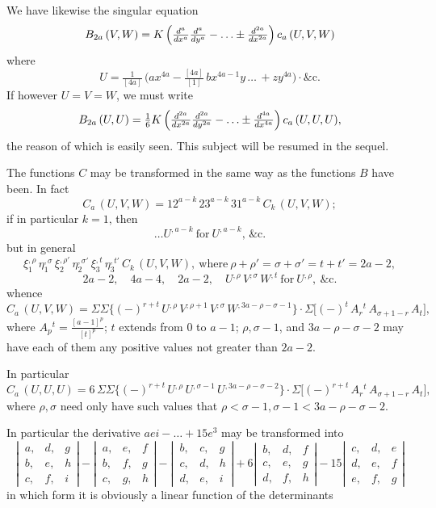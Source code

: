 \documentclass[11pt]{article}
\begin{document}
We have likewise the singular equation
\[
B_{2a}\,(V, W) = K\,\Bigl(\tfrac{d^a}{dx^a}\tfrac{d^a}{dy^a} - \ldots \pm \tfrac{d^{2a}}{dx^{2a}}\Bigr)\,c_a\,(U, V, W)
\]
where
\[
U = \tfrac{1}{[4a]}\,\bigl(a x^{4a} - \tfrac{[4a]}{[1]}\,b x^{4a-1} y \,\ldots\,+ z y^{4a}\bigr) \cdot \&\text{c.}
\]
If however $U = V = W$, we must write
\[
B_{2a}\,(U, U) = \tfrac{1}{6} K\,\Bigl(\tfrac{d^{2a}}{dx^{2a}}\tfrac{d^{2a}}{dy^{2a}} - \ldots \pm \tfrac{d^{4a}}{dx^{4a}}\Bigr)\,c_a\,(U, U, U),
\]
the reason of which is easily seen. This subject will be resumed in the sequel.

The functions $C$ may be transformed in the same way as the functions $B$ have been.
In fact
\[
C_a\,(U, V, W) = 12^{a-k}\,23^{a-k}\,31^{a-k}\,C_k\,(U, V, W);
\]
if in particular $k=1$, then
\[
\ldots U^{,a-k}\ \text{for}\ U^{,a-k},\,\&\text{c}.
\]
but in general
\[
\xi_1^{,\rho}\,\eta_1^{,\sigma}\,\xi_2^{,\rho'}\,\eta_2^{,\sigma'}\,\xi_3^{,t}\,\eta_3^{,t'}\,C_k\,(U, V, W),\ \text{where}\ \rho + \rho' = \sigma + \sigma' = t + t' = 2a - 2,
\]
\[
2a - 2,\quad 4a - 4,\quad 2a - 2,\quad U^{,\rho}\,V^{,\sigma}\,W^{,t}\ \text{for}\ U^{,\rho},\ \&\text{c.}
\]
whence
\[
C_a\,(U, V, W) = \Sigma\Sigma\bigl\{(-)^{r+t}\,U^{,\rho}\,V^{,\rho+1}\,V^{,\sigma}\,W^{,3a-\rho-\sigma-1}\bigr\}\cdot\Sigma\bigl[(-)^t\,A_r{}^t\,A_{\sigma+1-r}\,A_t\bigr],
\]
where $A_p{}^t = \tfrac{[a-1]^p}{[t]^p}$; $t$ extends from 0 to $a-1$; $\rho, \sigma - 1$, and $3a - \rho - \sigma - 2$ may have
each of them any positive values not greater than $2a - 2$.

In particular
\[
C_a\,(U, U, U) = 6\,\Sigma\Sigma\bigl\{(-)^{r+t}\,U^{,\rho}\,U^{,\sigma-1}\,U^{,3a-\rho-\sigma-2}\bigr\}\cdot\Sigma\bigl[(-)^{r+t}\,A_r{}^t\,A_{\sigma+1-r}\,A_t\bigr],
\]
where $\rho, \sigma$ need only have such values that $\rho < \sigma - 1, \sigma - 1 < 3a - \rho - \sigma - 2$.

In particular the derivative $aei - \ldots + 15 e^3$ may be transformed into
\[
\left|\,\begin{array}{ccc} a, & d, & g \\ b, & e, & h \\ c, & f, & i \end{array}\right|
- \left|\,\begin{array}{ccc} a, & e, & f \\ b, & f, & g \\ c, & g, & h \end{array}\right|
- \left|\,\begin{array}{ccc} b, & c, & g \\ c, & d, & h \\ d, & e, & i \end{array}\right|
+ 6 \left|\,\begin{array}{ccc} b, & d, & f \\ c, & e, & g \\ d, & f, & h \end{array}\right|
- 15 \left|\,\begin{array}{ccc} c, & d, & e \\ d, & e, & f \\ e, & f, & g \end{array}\right|
\]
in which form it is obviously a linear function of the determinants
\end{document}
